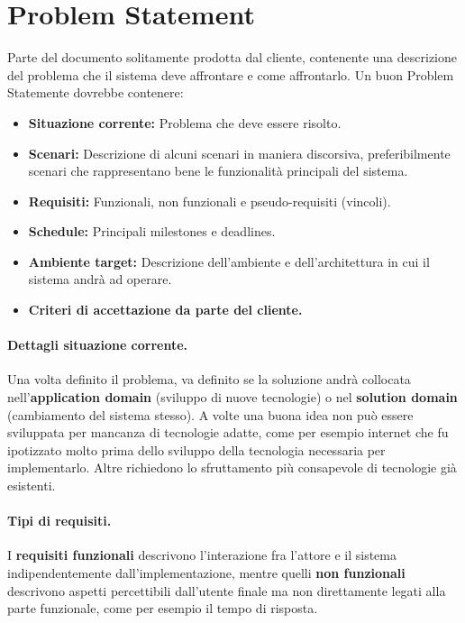 \section{Problem Statement}
    Parte del documento solitamente prodotta dal cliente, contenente una descrizione del problema che il sistema deve affrontare e come affrontarlo. Un buon Problem Statemente dovrebbe contenere:
    
    \begin{itemize}
        \item \textbf{Situazione corrente:} Problema che deve essere risolto.
        \item \textbf{Scenari:} Descrizione di alcuni scenari in maniera discorsiva, preferibilmente scenari che rappresentano bene le funzionalità principali del sistema.
        \item \textbf{Requisiti:} Funzionali, non funzionali e pseudo-requisiti (vincoli).
        \item \textbf{Schedule:} Principali milestones e deadlines.
        \item \textbf{Ambiente target:} Descrizione dell'ambiente e dell'architettura in cui il sistema andrà ad operare.
        \item \textbf{Criteri di accettazione da parte del cliente.}
    \end{itemize}
    
    \paragraph{Dettagli situazione corrente.} Una volta definito il problema, va definito se la soluzione andrà collocata nell'\textbf{application domain} (sviluppo di nuove tecnologie) o nel \textbf{solution domain} (cambiamento del sistema stesso). A volte una buona idea non può essere sviluppata per mancanza di tecnologie adatte, come per esempio internet che fu ipotizzato molto prima dello sviluppo della tecnologia necessaria per implementarlo. Altre richiedono lo sfruttamento più consapevole di tecnologie già esistenti.
    
    \paragraph{Tipi di requisiti.} I \textbf{requisiti funzionali} descrivono l'interazione fra l'attore e il sistema indipendentemente dall'implementazione, mentre quelli \textbf{non funzionali} descrivono aspetti percettibili dall'utente finale ma non direttamente legati alla parte funzionale, come per esempio il tempo di risposta.
    
